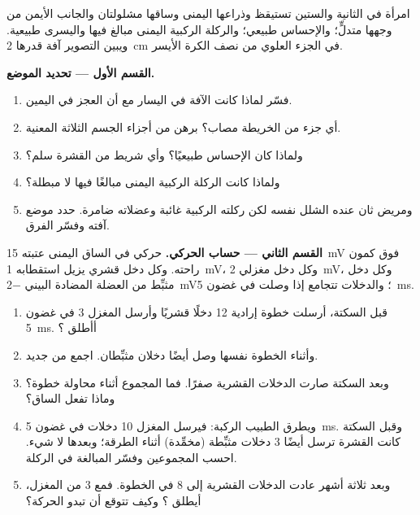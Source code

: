 \begin{problem}
\label{pb:g12:brain-and-movement:1}
امرأة في الثانية والستين تستيقظ وذراعها اليمنى وساقها مشلولتان والجانب
الأيمن من وجهها متدلٍّ؛ والإحساس طبيعي؛ والركلة الركبية اليمنى مبالغ
فيها واليسرى طبيعية. ويبين التصوير آفة قدرها \qty{2}{cm} في الجزء
العلوي من نصف الكرة الأيسر.

\medskip
\noindent\textbf{القسم الأول --- تحديد الموضع.}
\begin{enumerate}
  \item فسّر لماذا كانت الآفة في اليسار مع أن العجز في اليمين.
  \item أي جزء من الخريطة مصاب؟ برهن من أجزاء الجسم الثلاثة المعنية.
  \item ولماذا كان الإحساس طبيعيًا؟ وأي شريط من القشرة سلم؟
  \item ولماذا كانت الركلة الركبية اليمنى مبالغًا فيها لا مبطلة؟
  \item ومريض ثان عنده الشلل نفسه لكن ركلته الركبية غائبة وعضلاته
        ضامرة. حدد موضع آفته وفسّر الفرق.
\end{enumerate}

\medskip
\noindent\textbf{القسم الثاني --- حساب  الحركي.}
 حركي في الساق اليمنى عتبته \qty{15}{mV} فوق كمون راحته. وكل دخل
قشري يزيل استقطابه \qty{1}{mV}، وكل دخل مغزلي \qty{2}{mV}، وكل دخل
مثبِّط من  العضلة المضادة البيني \qty{-2}{mV}؛ والدخلات تتجامع إذا
وصلت في غضون \qty{5}{ms}.
\begin{enumerate}[resume]
  \item قبل السكتة، أرسلت خطوة إرادية 12 دخلًا قشريًا وأرسل المغزل 3 في
        غضون \qty{5}{ms}. أأطلق ؟
  \item وأثناء الخطوة نفسها وصل أيضًا دخلان مثبِّطان. اجمع من جديد.
  \item وبعد السكتة صارت الدخلات القشرية صفرًا. فما المجموع أثناء
        محاولة خطوة؟ وماذا تفعل الساق؟
  \item ويطرق الطبيب الركبة: فيرسل المغزل 10 دخلات في غضون \qty{5}{ms}.
        وقبل السكتة كانت القشرة ترسل أيضًا 3 دخلات مثبِّطة (مخمِّدة)
        أثناء الطرقة؛ وبعدها لا شيء. احسب المجموعين وفسّر المبالغة في
        الركلة.
  \item وبعد ثلاثة أشهر عادت الدخلات القشرية إلى 8 في الخطوة. فمع 3 من
        المغزل، أيطلق ؟ وكيف تتوقع أن تبدو الحركة؟
\end{enumerate}


\end{problem}
